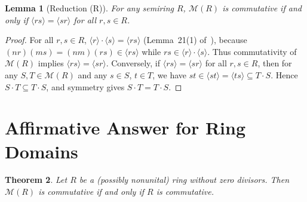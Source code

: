 \documentclass[11pt]{article}
\newtheorem{theorem}{Theorem}
\newtheorem{lemma}[theorem]{Lemma}
\theoremstyle{remark}
\begin{document}
\begin{lemma}[Reduction (R)]\label{lem:R}
For any semiring $R$, $\mathcal{M}(R)$ is commutative if and only if $\langle rs \rangle = \langle sr \rangle$ for all $r, s \in R$.
\end{lemma}

\begin{proof}
For all $r, s \in R$, $\langle r \rangle \cdot \langle s \rangle = \langle rs \rangle$ (Lemma~21(1) of~\cite{Mesyan2026}), because $(nr)(ms) = (nm)(rs) \in \langle rs \rangle$ while $rs \in \langle r \rangle \cdot \langle s \rangle$. Thus commutativity of $\mathcal{M}(R)$ implies $\langle rs \rangle = \langle sr \rangle$. Conversely, if $\langle rs \rangle = \langle sr \rangle$ for all $r, s \in R$, then for any $S, T \in \mathcal{M}(R)$ and any $s \in S$, $t \in T$, we have $st \in \langle st \rangle = \langle ts \rangle \subseteq T \cdot S$. Hence $S \cdot T \subseteq T \cdot S$, and symmetry gives $S \cdot T = T \cdot S$.
\end{proof}

\section{Affirmative Answer for Ring Domains}

\begin{theorem}\label{thm:A}
Let $R$ be a (possibly nonunital) ring without zero divisors. Then $\mathcal{M}(R)$ is commutative if and only if $R$ is commutative.
\end{theorem}
\end{document}
